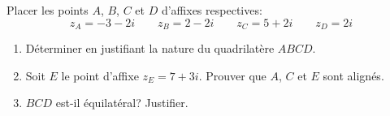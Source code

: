 \begin{exercice}
Placer les points $A$, $B$, $C$ et $D$ d'affixes respectives:
\[ z_A=-3-2i \qquad z_B=2-2i \qquad z_C=5+2i  \qquad z_D=2i\]
\begin{enumerate}
\item D\'eterminer en justifiant la nature du quadrilat\`ere $ABCD$.
\item Soit $E$ le point d'affixe $z_E=7+3i$. Prouver que $A$, $C$ et
  $E$ sont align\'es.
\item $BCD$ est-il \'equilat\'eral? Justifier.
\end{enumerate}

 
\end{exercice}
